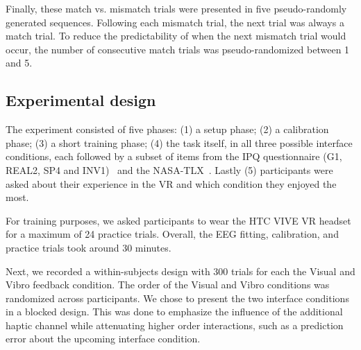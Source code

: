 Finally, these match vs. mismatch trials were presented in five pseudo-randomly generated sequences. Following each mismatch trial, the next trial was always a match trial. To reduce the predictability of when the next mismatch trial would occur, the number of consecutive match trials was pseudo-randomized between 1 and 5.

\subsection{Experimental design}
The experiment consisted of five phases: (1) a setup phase; (2) a calibration phase; (3) a short training phase; (4) the task itself, in all three possible interface conditions, each followed by a subset of items from the IPQ questionnaire (G1, REAL2, SP4 and INV1)~\cite{Schubert2003-sq} and the NASA-TLX~\cite{Hart1988-iw}. Lastly (5) participants were asked about their experience in the VR and which condition they enjoyed the most.

For training purposes, we asked participants to wear the HTC VIVE VR headset for a maximum of 24 practice trials. Overall, the EEG fitting, calibration, and practice trials took around 30 minutes. 

Next, we recorded a within-subjects design with 300 trials for each the Visual and Vibro feedback condition. The order of the Visual and Vibro conditions was randomized across participants. We chose to present the two interface conditions in a blocked design. This was done to emphasize the influence of the additional haptic channel while attenuating higher order interactions, such as a prediction error about the upcoming interface condition.





